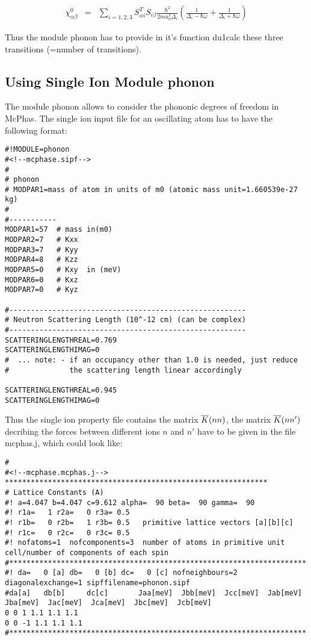 \begin{eqnarray}
\chi^0_{\alpha\beta}
&=& \sum_{i=1,2,3} S^T_{\alpha i}S_{i\beta}\frac{\hbar^2}{2ma_0^2\Delta_i}
\left(\frac{1}{\Delta_i-\hbar\omega}+\frac{1}{\Delta_i+\hbar\omega}\right )
\end{eqnarray}

Thus the module {\prg phonon} has to provide in it's function {\prg du1calc} these three
transitions (=number of transitions).

\subsection{Using Single Ion Module {\prg phonon}}

The module {\prg phonon} allows to consider the phononic degrees of freedom in McPhas.
The single ion input file for an oscillating atom has to have the following format:

\begin{verbatim}
#!MODULE=phonon
#<!--mcphase.sipf-->
#
# phonon
# MODPAR1=mass of atom in units of m0 (atomic mass unit=1.660539e-27 kg)
#
#-----------
MODPAR1=57  # mass in(m0)
MODPAR2=7   # Kxx
MODPAR3=7   # Kyy
MODPAR4=8   # Kzz
MODPAR5=0   # Kxy  in (meV)
MODPAR6=0   # Kxz
MODPAR7=0   # Kyz

#-------------------------------------------------------
# Neutron Scattering Length (10^-12 cm) (can be complex)
#-------------------------------------------------------
SCATTERINGLENGTHREAL=0.769
SCATTERINGLENGTHIMAG=0
#  ... note: - if an occupancy other than 1.0 is needed, just reduce 
#              the scattering length linear accordingly

SCATTERINGLENGTHREAL=0.945
SCATTERINGLENGTHIMAG=0
\end{verbatim}

Thus the single ion property file contains the matrix $\overline{K}(nn)$, the matrix $\overline{K}(nn')$ decribing the
forces between
different ions $n$ and $n'$ have to be given in the file {\prg mcphas.j}, which could
look like:

\begin{verbatim}
# 
#<!--mcphase.mcphas.j-->
*************************************************************
# Lattice Constants (A)
#! a=4.047 b=4.047 c=9.612 alpha=  90 beta=  90 gamma=  90
#! r1a=   1 r2a=   0 r3a= 0.5
#! r1b=   0 r2b=   1 r3b= 0.5   primitive lattice vectors [a][b][c]
#! r1c=   0 r2c=   0 r3c= 0.5
#! nofatoms=1  nofcomponents=3  number of atoms in primitive unit cell/number of components of each spin
#*********************************************************************
#! da=   0 [a] db=   0 [b] dc=   0 [c] nofneighbours=2 diagonalexchange=1 sipffilename=phonon.sipf
#da[a]   db[b]     dc[c]       Jaa[meV]  Jbb[meV]  Jcc[meV]  Jab[meV]  Jba[meV]  Jac[meV]  Jca[meV]  Jbc[meV]  Jcb[meV]
0 0 1 1.1 1.1 1.1
0 0 -1 1.1 1.1 1.1 
#*********************************************************************
\end{verbatim}

